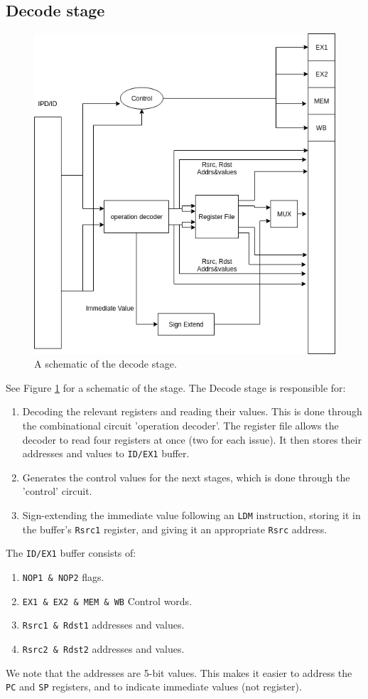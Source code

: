 \documentclass[12pt]{article}
\begin{document}
\subsection{Decode stage}
\begin{figure}
	\centering
	\includegraphics[width=\linewidth]{figures/decode.png}
	\caption{A schematic of the decode stage.}
	\label{fig:decode}
\end{figure}
See Figure \ref{fig:decode} for a schematic of the stage.
The Decode stage is responsible for:
\begin{enumerate}
\item Decoding the relevant registers and reading their values. This is done through the combinational circuit 'operation decoder'. The register file allows the decoder to read four registers at once (two for each issue). It then stores their addresses and values to \texttt{ID/EX1} buffer. 
\item Generates the control values for the next stages, which is done through the 'control' circuit.
\item Sign-extending the immediate value following an \texttt{LDM} instruction, storing it in the buffer's \texttt{Rsrc1} register, and giving it an appropriate \texttt{Rsrc} address.
\end{enumerate}
The \texttt{ID/EX1} buffer consists of:
 \begin{enumerate}
\item \texttt{NOP1 \& NOP2} flags.
\item \texttt{EX1 \& EX2 \& MEM \& WB} Control words.  
\item \texttt{Rsrc1 \& Rdst1} addresses and values.
\item \texttt{Rsrc2 \& Rdst2} addresses and values.
\end{enumerate}
We note that the addresses are 5-bit values. This makes it easier to address the \texttt{PC} and \texttt{SP} registers, and to indicate immediate values (not register).
\end{document}
